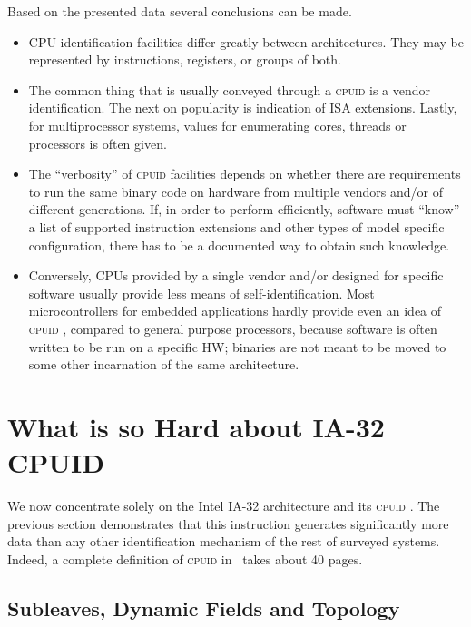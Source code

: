 \documentclass[a4paper,10pt,oneside,unicode]{article}
\newcommand{\cpuid}{\textsc{cpuid} }
\begin{document}
Based on the presented data several conclusions can be made.
\begin{itemize}
    \item {CPU} identification facilities differ greatly between architectures. They may be represented by instructions, registers, or groups of both.
    \item The common thing that is usually conveyed through a \cpuid is a vendor identification. The next on popularity is indication of ISA extensions. Lastly, for multiprocessor systems, values for enumerating cores, threads or processors is often given.
    
    \item The “verbosity” of \cpuid facilities depends on whether there are requirements to run the same binary code on hardware from multiple vendors and/or of different generations. If, in order to perform efficiently, software must “know” a list of supported instruction extensions and other types of model specific configuration, there has to be a documented way to obtain such knowledge.
    \item Conversely, {CPUs} provided by a single vendor and/or designed for specific software usually provide less means of self-identification. Most microcontrollers for embedded applications hardly provide even an idea of \cpuid, compared to general purpose processors, because software is often written to be run on a specific HW; binaries are not meant to be moved to some other incarnation of the same architecture.
    
\end{itemize}

\section{What is so Hard about IA-32 CPUID}\label{sec:ia-32-cpuid}

We now concentrate solely on the Intel IA-32 architecture and its \cpuid. The previous section demonstrates that this instruction generates significantly more data than any other identification mechanism of the rest of surveyed systems. Indeed, a complete definition of \cpuid in~\cite{intelmanual-7vols} takes about 40 pages. 

\subsection{Subleaves, Dynamic Fields and Topology}
\end{document}
